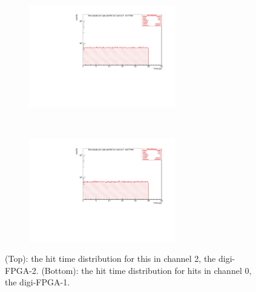 \begin{figure}[!h]
  \begin{subfigure}[b]{\textwidth}
      \centering
      \includegraphics[width=0.7\textwidth]{figures/pdf/figure_00001_timedistr_roc_simulation_10538.pdf}
      \label{fig:ttt1}
  \end{subfigure}
\\
  \begin{subfigure}[b]{\textwidth}
      \centering
      \includegraphics[width=0.7\textwidth]{figures/pdf/figure_00012_timedistr_roc_simulation_ch2_105038.pdf}
      \label{fig:ttt2}
  \end{subfigure}
     \caption{(Top): the hit time distribution for this in channel 2, the digi-FPGA-2. 
     (Bottom): the hit time distribution for hits in channel 0, the digi-FPGA-1.}
     \label{fig:4}
\end{figure}

